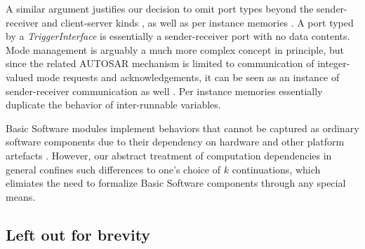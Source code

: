 \documentclass[10pt,conference]{IEEEtran}
\begin{document}
A similar argument justifies our decision to omit port types beyond the sender-receiver and client-server kinds \cite[ch.~4.2]{AR:SWC}, as well as per instance memories \cite[ch.~7.7]{AR:SWC}. A port typed by a \emph{TriggerInterface} \cite[ch.~4.4.7]{AR:SWC} is essentially a sender-receiver port with no data contents. Mode management is arguably a much more complex concept in principle, but since the related AUTOSAR mechanism is limited to communication of integer-valued mode requests and acknowledgements, it can be seen as an instance of sender-receiver communication as well \cite[ch.~4.4.6]{AR:SWC}. Per instance memories essentially duplicate the behavior of inter-runnable variables.

Basic Software modules implement behaviors that cannot be captured as ordinary software components due to their dependency on hardware and other platform artefacts \cite{AR:BSW} \cite[ch.~4.2]{AR:RTE}. However, our abstract treatment of computation dependencies in general confines such differences to one's choice of $k$ continuations, which elimiates the need to formalize Basic Software components through any special means.


\subsection{Left out for brevity}
\end{document}
